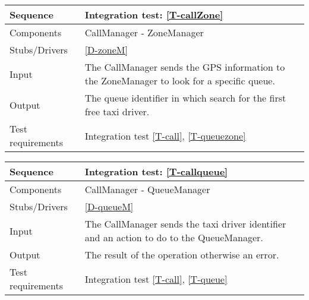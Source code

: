 \begin{table}[H]
    \begin{tabularx}{\textwidth}{l|X}
        \hline
        Sequence
        & 
        Integration test: \ref{T-callZone}
        \\ \hline
        Components 
        & 
        CallManager - ZoneManager
        \\ \hline
        Stubs/Drivers 
        & 
        \ref{D-zoneM}
        \\ \hline
        Input 
        & 
        The CallManager sends the GPS information to the ZoneManager to look for a specific queue.
        \\ \hline
        Output 
        & 
        The queue identifier in which search for the first free taxi driver.
        \\ \hline
        Test requirements 
        & 
        Integration test \ref{T-call}, \ref{T-queuezone}
        \\ \hline
    \end{tabularx}
\end{table}

\begin{table}[H]
    \begin{tabularx}{\textwidth}{l|X}
        \hline
        Sequence
        & 
        Integration test: \ref{T-callqueue}
        \\ \hline
        Components 
        & 
        CallManager - QueueManager
        \\ \hline
        Stubs/Drivers 
        & 
        \ref{D-queueM}
        \\ \hline
        Input 
        & 
        The CallManager sends the taxi driver identifier and an action to do to the QueueManager.
        \\ \hline
        Output 
        & 
        The result of the operation otherwise an error.
        \\ \hline
        Test requirements 
        & 
        Integration test \ref{T-call}, \ref{T-queue}
        \\ \hline
    \end{tabularx}
\end{table}

